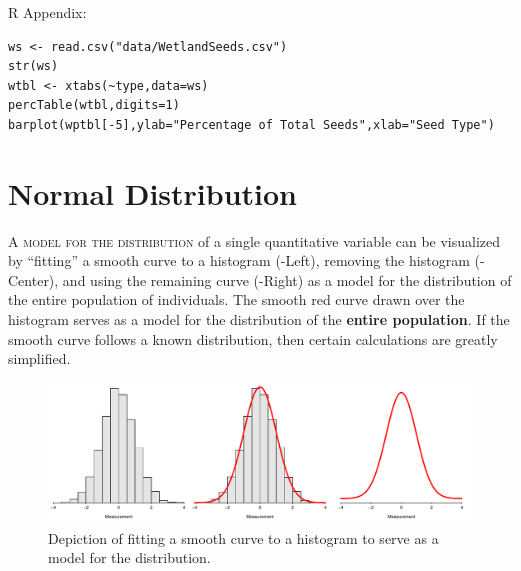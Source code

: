 \documentclass[10pt,openany]{book}\usepackage[]{graphicx}\usepackage[]{color}
\makeatletter
\newenvironment{kframe}{%
 \def\at@end@of@kframe{}%
 \ifinner\ifhmode%
  \def\at@end@of@kframe{\end{minipage}}%
  \begin{minipage}{\columnwidth}%
 \fi\fi%
 \def\FrameCommand##1{\hskip\@totalleftmargin \hskip-\fboxsep
 \colorbox{shadecolor}{##1}\hskip-\fboxsep
     \hskip-\linewidth \hskip-\@totalleftmargin \hskip\columnwidth}%
 \MakeFramed {\advance\hsize-\width
   \@totalleftmargin\z@ \linewidth\hsize
   \@setminipage}}%
 {\par\unskip\endMakeFramed%
 \at@end@of@kframe}
\newenvironment{knitrout}{}{} %
\makeatother
\begin{document}
\begin{minipage}{\textwidth}
R Appendix:
\begin{knitrout}
\color{fgcolor}\begin{kframe}
\begin{verbatim}
ws <- read.csv("data/WetlandSeeds.csv")
str(ws)
wtbl <- xtabs(~type,data=ws)
percTable(wtbl,digits=1)
barplot(wptbl[-5],ylab="Percentage of Total Seeds",xlab="Seed Type")
\end{verbatim}
\end{kframe}
\end{knitrout}
\end{minipage}



\chapter{Normal Distribution}  \label{chap:NormDist}

\vspace{-24pt}
\minitoc
\vspace{24pt}

\lettrine{A}{ model for the distribution} of a single quantitative variable can be visualized by ``fitting'' a smooth curve to a histogram (-Left), removing the histogram (-Center), and using the remaining curve (-Right) as a model for the distribution of the entire population of individuals. The smooth red curve drawn over the histogram serves as a model for the distribution of the \textbf{entire population}. If the smooth curve follows a known distribution, then certain calculations are greatly simplified.

\begin{knitrout}
\color{fgcolor}\begin{figure}[hbtp]

{\centering \includegraphics[width=.95\linewidth]{Figs/NormDensityEx-1} 

}

\caption[Depiction of fitting a smooth curve to a histogram to serve as a model for the distribution]{Depiction of fitting a smooth curve to a histogram to serve as a model for the distribution.}\label{fig:NormDensityEx}
\end{figure}


\end{knitrout}
\end{document}
